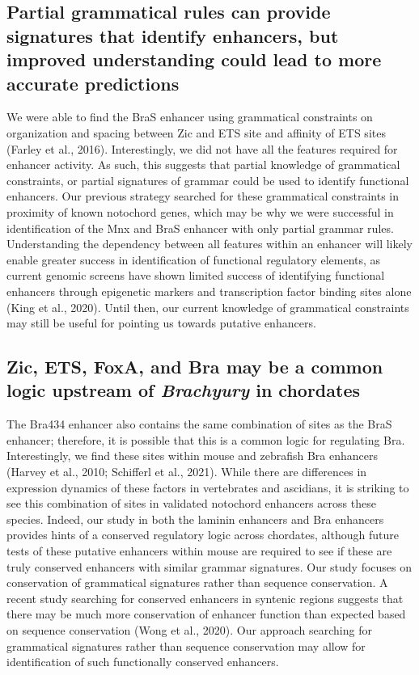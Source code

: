 \subsection{Partial grammatical rules can provide signatures that identify enhancers, but improved understanding could lead to more accurate predictions}

We were able to find the BraS enhancer using grammatical constraints on organization and spacing between Zic and ETS site and affinity of ETS sites (Farley et al., 2016). Interestingly, we did not have all the features required for enhancer activity. As such, this suggests that partial knowledge of grammatical constraints, or partial signatures of grammar could be used to identify functional enhancers. Our previous strategy searched for these grammatical constraints in proximity of known notochord genes, which may be why we were successful in identification of the Mnx and BraS enhancer with only partial grammar rules. Understanding the dependency between all features within an enhancer will likely enable greater success in identification of functional regulatory elements, as current genomic screens have shown limited success of identifying functional enhancers through epigenetic markers and transcription factor binding sites alone (King et al., 2020). Until then, our current knowledge of grammatical constraints may still be useful for pointing us towards putative enhancers. 

\subsection{Zic, ETS, FoxA, and Bra may be a common logic upstream of \textit{Brachyury} in chordates}

The Bra434 enhancer also contains the same combination of sites as the BraS enhancer; therefore, it is possible that this is a common logic for regulating Bra. Interestingly, we find these sites within mouse and zebrafish Bra enhancers (Harvey et al., 2010; Schifferl et al., 2021). While there are differences in expression dynamics of these factors in vertebrates and ascidians, it is striking to see this combination of sites in validated notochord enhancers across these species. Indeed, our study in both the laminin enhancers and Bra enhancers provides hints of a conserved regulatory logic across chordates, although future tests of these putative enhancers within mouse are required to see if these are truly conserved enhancers with similar grammar signatures. Our study focuses on conservation of grammatical signatures rather than sequence conservation. A recent study searching for conserved enhancers in syntenic regions suggests that there may be much more conservation of enhancer function than expected based on sequence conservation (Wong et al., 2020). Our approach searching for grammatical signatures rather than sequence conservation may allow for identification of such functionally conserved enhancers.

